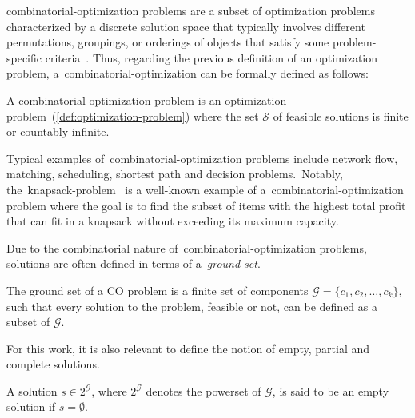 \acrfull{combinatorial-optimization} problems are a subset of optimization
problems characterized by a discrete solution space that typically involves
different permutations, groupings, or orderings of objects that satisfy some
problem-specific
criteria~\cite{papadimitriou1998combinatorial,vieira2009uma,blum2003metaheuristics,yu2010combinatorial}.
Thus, regarding the previous definition of an optimization problem,
a~\acrshort{combinatorial-optimization} can be formally defined as follows:

\begin{definition}
  \label{def:combinatorial-optimization-problem}
  A combinatorial optimization problem is an optimization
  problem~(\ref{def:optimization-problem}) where the set $\mathcal{S}$ of
  feasible solutions is finite or countably infinite.
\end{definition}

Typical examples of~\acrshort{combinatorial-optimization} problems include
network flow, matching, scheduling, shortest path and decision problems.~Notably,
the~\acrfull{knapsack-problem}~\cite{cacchiani2022knapsack,
  yu2010combinatorial,festa2014brief} is a well-known example of
a~\acrshort{combinatorial-optimization} problem where the goal is to find the
subset of items with the highest total profit that can fit in a knapsack without
exceeding its maximum capacity.

Due to the combinatorial nature of~\acrshort{combinatorial-optimization}
problems, solutions are often defined in terms of a~\emph{ground set}.

\begin{definition}
  The ground set of a CO problem is a finite set of
  components $\mathcal{G} = \{c_1, c_2, \ldots, c_k\}$, such that every solution to the
  problem, feasible or not, can be defined as a subset of $\mathcal{G}$.  \end{definition}

For this work, it is also relevant to define the notion of empty, partial and
complete solutions.

\begin{definition}
  \label{def:empty-solution}
  A solution $s \in 2^\mathcal{G}$, where $2^\mathcal{G}$ denotes the powerset of $\mathcal{G}$,
  is said to be an empty solution if $s = \emptyset$.
\end{definition}


